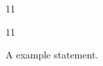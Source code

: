 \documentclass[paper=A4]{ropas-poster}
\begin{document}
\begin{postergrid}{1}{1}
\begin{posterblock}{1}{1}
\begin{example}A example statement.\end{example}
\end{posterblock}
\end{postergrid}
\end{document}
